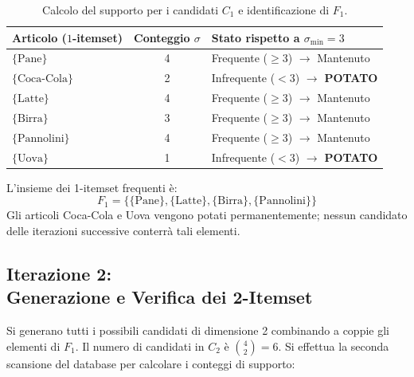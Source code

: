 \begin{table}[H]
\centering
\small
\renewcommand{\arraystretch}{1.2}
\begin{tabular}{l c l}
\toprule
\textbf{Articolo ($1$-itemset)} & \textbf{Conteggio $\sigma$} & \textbf{Stato rispetto a $\sigma_{\min} = 3$} \\
\midrule
$\{\text{Pane}\}$ & 4 & Frequente ($\ge 3$) $\rightarrow$ Mantenuto \\
$\{\text{Coca-Cola}\}$ & 2 & Infrequente ($< 3$) $\rightarrow$ \textbf{POTATO} \\
$\{\text{Latte}\}$ & 4 & Frequente ($\ge 3$) $\rightarrow$ Mantenuto \\
$\{\text{Birra}\}$ & 3 & Frequente ($\ge 3$) $\rightarrow$ Mantenuto \\
$\{\text{Pannolini}\}$ & 4 & Frequente ($\ge 3$) $\rightarrow$ Mantenuto \\
$\{\text{Uova}\}$ & 1 & Infrequente ($< 3$) $\rightarrow$ \textbf{POTATO} \\
\bottomrule
\end{tabular}
\caption{Calcolo del supporto per i candidati $C_1$ e identificazione di $F_1$.}
\label{tab:dm-apriori-f1}
\end{table}

L'insieme dei 1-itemset frequenti è:
\begin{equation}
F_1 = \{\{\text{Pane}\}, \{\text{Latte}\}, \{\text{Birra}\}, \{\text{Pannolini}\}\}
\end{equation}
Gli articoli Coca-Cola e Uova vengono potati permanentemente; nessun candidato delle iterazioni successive conterrà tali elementi.

\subsection[Iterazione 2: Generazione e Verifica dei 2-Itemset]{Iterazione 2:\\Generazione e Verifica dei 2-Itemset}
Si generano tutti i possibili candidati di dimensione 2 combinando a coppie gli elementi di $F_1$. Il numero di candidati in $C_2$ è $\binom{4}{2} = 6$.
Si effettua la seconda scansione del database per calcolare i conteggi di supporto:

